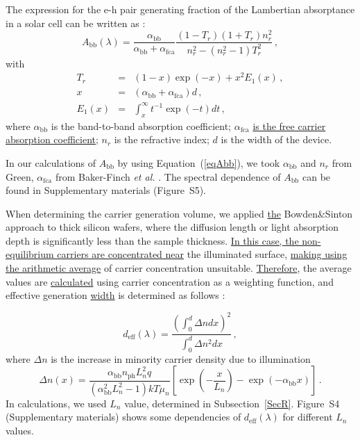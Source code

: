 \documentclass{WileyMSP-template}
\begin{document}
The expression for the e-h pair generating fraction of the Lambertian absorptance in a solar cell
can be written as \cite{Schaefer2018}:
\begin{equation}
\label{eqAbb}
A_\mathrm{bb}(\lambda)=\frac{\alpha_\mathrm{bb}}{\alpha_\mathrm{bb}+\alpha_\mathrm{fca}}\frac{(1-T_r)(1+T_r)n_r^2}{n_r^2-(n_r^2-1)T_r^2}\,,
\end{equation}
with
\begin{eqnarray*}
T_r&=&(1-x)\exp(-x)+x^2E_1(x)\,,\\
x&=&(\alpha_\mathrm{bb}+\alpha_\mathrm{fca})d\,,\\
E_1(x)&=&\int_x^\infty t^{-1}\exp(-t)dt\,,
\end{eqnarray*}
where
$\alpha_\mathrm{bb}$ is the band-to-band absorption coefficient;
$\alpha_\mathrm{fca}$ \textcolor[rgb]{0.00,0.07,1.00}{\uline{is the free carrier absorption coefficient}};
$n_r$ is the refractive index;
$d$ is the width of the device.

In our calculations of $A_\mathrm{bb}$ by using Equation~(\ref{eqAbb}), we took  $\alpha_\mathrm{bb}$ and
$n_r$ from Green\cite{Green2022}, $\alpha_\mathrm{fca}$  from Baker-Finch \emph{et al.} \cite{SiFCA}.
The spectral dependence of \textcolor[rgb]{0.00,0.07,1.00}{\uline{$A_\mathrm{bb}$}} can be found in Supplementary materials (Figure~S5).

When determining the carrier generation volume, we applied \textcolor[rgb]{0.00,0.07,1.00}{\uline{the}} Bowden\&Sinton  approach \cite{Bowden2007} to thick silicon wafers,
where the diffusion length or light absorption depth is significantly less than the sample thickness.
\textcolor[rgb]{0.00,0.07,1.00}{\uline{In this case, the non-equilibrium carriers are concentrated near}} the illuminated surface,
\textcolor[rgb]{0.00,0.07,1.00}{\uline{making using the arithmetic average}} of carrier concentration unsuitable.
\textcolor[rgb]{0.00,0.07,1.00}{\uline{Therefore}}, the average values are \textcolor[rgb]{0.00,0.07,1.00}{\uline{calculated}} using carrier concentration as a weighting function,
and effective generation \textcolor[rgb]{0.00,0.07,1.00}{\uline{width}} is determined as follows \cite{Bowden2007}:

\begin{equation}
\label{eqdeff}
d_\mathrm{eff}(\lambda)=\frac{\left(\int_0^d \Delta n dx\right)^2}{\int_0^d \Delta n^2 dx}\,,
\end{equation}
where
$\Delta n$ is the increase in minority carrier density due to illumination
\begin{equation}
\label{eqdeln}
\Delta n (x)=\frac{\alpha_\mathrm{bb} n_\mathrm{ph} L_n^2 q}{(\alpha_\mathrm{bb}^2 L_n^2-1)kT\mu_n}
\left[\exp\left(-\frac{x}{L_n}\right)-\exp\left(-\alpha_\mathrm{bb} x\right)\right]\,.
\end{equation}
In calculations, we used $L_n$ value, determined in Subsection~\ref{SecR}.
Figure~S4 (Supplementary materials) shows some dependencies of $d_\mathrm{eff}(\lambda)$ for different $L_n$ values.
\end{document}
